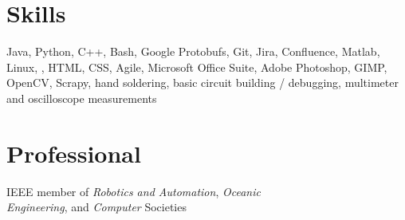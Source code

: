 \documentclass{article}
\begin{document}
{\begin{multicols}{2}
                \section*{Skills} 
                \noindent
                Java, Python, C++, Bash, Google Protobufs, Git, Jira, Confluence, Matlab, Linux, \LaTeXe, HTML, CSS, Agile, Microsoft Office Suite, Adobe Photoshop, GIMP, OpenCV, Scrapy, hand soldering, basic circuit building / debugging, multimeter and oscilloscope measurements
            \section*{Professional} 
                \noindent
                IEEE member of \textsl{Robotics and Automation}, \textsl{Oceanic \\Engineering}, and \textsl{Computer} Societies  
        \end{multicols}
    }
\end{document}
